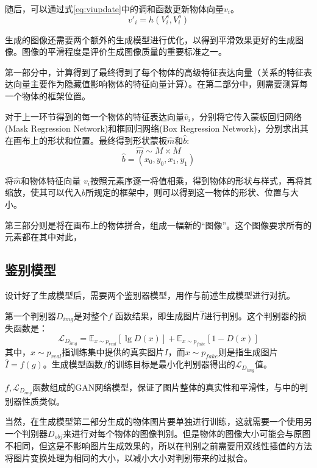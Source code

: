 随后，可以通过式\eqref{eq:viupdate}中的调和函数更新物体向量$ v_i $。
\begin{equation}
    v'_i = h(V_i^s, V_i^o)
    \label{eq:viupdate}
\end{equation}

生成的图像还需要两个额外的生成模型进行优化，以得到平滑效果更好的生成图像。图像的平滑程度是评价生成图像质量的重要标准之一。

第一部分中，计算得到了最终得到了每个物体的高级特征表达向量（关系的特征表达向量主要作为隐藏值影响物体的特征向量计算）。在第二部分中，则需要测算每一个物体的框架位置。

对于上一环节得到的每一个物体的特征表达向量$\hat{v}_i$，分别将它传入蒙板回归网络(Mask Regression Network)和框回归网络(Box Regression Network)，分别求出其在画布上的形状和位置。最终得到形状蒙板$\hat{m}$和$\hat{b}$:
$$\hat{m} \sim M \times M$$
$$\hat{b} = (x_0,y_0,x_1,y_1)$$

将$\hat{m} $和物体特征向量 $v_i $按照元素序逐一将值相乘，得到物体的形状与样式，再将其缩放，使其可以代入$\hat{b}$所规定的框架中，则可以得到这一物体的形状、位置与大小。

第三部分则是将在画布上的物体拼合，组成一幅新的“图像”。这个图像要求所有的元素都在其中对此，

\subsection{鉴别模型}
设计好了生成模型后，需要两个鉴别器模型，用作与前述生成模型进行对抗。

第一个判别器$D_{img}$是对整个$f$ 函数结果，即生成图片$\hat{I}$进行判别。这个判别器的损失函数是：
\begin{equation}
    \mathcal{L}_{D_{img}} = \mathbb{E}_{x\sim p_{real}} [\lg D(x)] + \mathbb{E}_{x\sim p_{fake}} [1-D(x)]
    \label{eq:lossdimg}
\end{equation}
其中，$x\sim p_{real}$指训练集中提供的真实图片$I$，而$x\sim p_{fake}$则是指生成图片$\hat{I}=f(g)$。生成模型函数$f$的训练目标是最小化判别器得出的$\mathcal{L}_{D_{img}}$值。

$f, \mathcal{L}_{D_{img}}$函数组成的GAN网络模型，保证了图片整体的真实性和平滑性，与\cite{isola2017image}中的判别器性质类似。

当然，在生成模型第二部分生成的物体图片要单独进行训练，这就需要一个使用另一个判别器${D_{obj}}$来进行对每个物体的图像判别。但是物体的图像大小可能会与原图不相同，但这是不影响图片生成效果的，所以在判别之前需要用双线性插值的方法将图片变换处理为相同的大小，以减小大小对判别带来的过拟合。 

